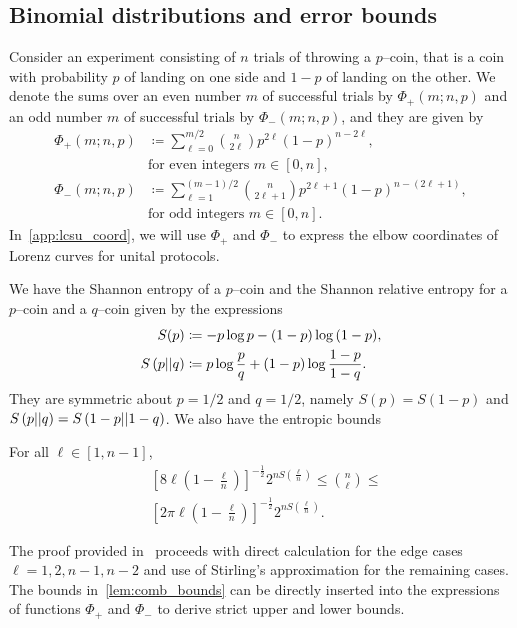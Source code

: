 \documentclass[pra,
aps,
twocolumn,
superscriptaddress,
groupedaddress,
nofootinbib,
reprint
]{revtex4-1}
\begin{document}
\subsection{Binomial distributions and error bounds}\label{app:phi}
Consider an experiment consisting of $n$ trials of throwing a $p$--coin, that is a coin with probability $p$ of landing on one side and $1-p$ of landing on the other.
We denote the sums over an even number $m$ of successful trials by $\Phi_+(m; n, p)$ and an odd number $m$ of successful trials by $\Phi_-(m; n, p)$, and they are given by
\begin{align}	
	\Phi_+(m; n, p) &\coloneqq \sum\limits_{\ell=0}^{m/2} \binom{n}{2\ell} p^{2\ell} (1-p)^{n-2\ell}, \nonumber\\ 
	&\text{for even integers } m\in[0,n], \label{eq:fp_app} \\
	\Phi_-(m; n, p) &\coloneqq \sum\limits_{\ell=1}^{(m-1)/2} \binom{n}{2\ell+1} p^{2\ell+1} (1-p)^{n-(2\ell+1)}, \nonumber\\ 
	&\text{for odd integers }m\in[0,n]. \label{eq:fn_app}
\end{align}
In~\cref{app:lcsu_coord}, we will use $\Phi_+$ and $\Phi_-$ to express the elbow coordinates of Lorenz curves for unital protocols.

We have the Shannon entropy of a $p$--coin and the Shannon relative entropy for a $p$--coin and a $q$--coin given by the expressions
\begin{align}
	S(p) &\coloneqq -p\log{p} -(1-p)\log{(1-p)}, \label{eq:ent}\\
	S\left( p \middle\vert\middle\vert q \right) &\coloneqq p \log{\frac{p}{q}} + (1-p) \log{\frac{1-p}{1-q}}. \label{eq:ent_rel}
\end{align}
They are symmetric about $p=1/2$ and $q=1/2$, namely $S(p) = S(1-p)$ and $S\left( p \middle\vert\middle\vert q \right) = S\left( 1-p \middle\vert\middle\vert 1-q \right)$. We also have the entropic bounds
\begin{lemma}\label{lem:comb_bounds}
	For all $\ell\in [1,n-1]$,
	\begin{align}
		&\left[ 8\ell\left(1-\frac{\ell}{n}\right) \right]^{-\frac{1}{2}} 2^{n S\left(\frac{\ell}{n}\right)} \leq \binom{n}{\ell} \leq \\
		&\left[ 2\pi \ell\left(1-\frac{\ell}{n}\right) \right]^{-\frac{1}{2}} 2^{n S\left(\frac{\ell}{n}\right)}.
	\end{align}
\end{lemma}
The proof provided in~\cite{cit:ash} proceeds with direct calculation for the edge cases $\ell = 1,2, n-1, n-2$ and use of Stirling's approximation for the remaining cases. The bounds in~\cref{lem:comb_bounds} can be directly inserted into the expressions of functions $\Phi_+$ and $\Phi_-$ to derive strict upper and lower bounds.
\end{document}
